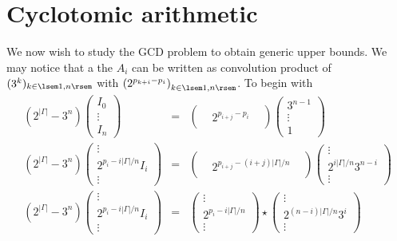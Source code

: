\documentclass[12pt,a4paper]{article}
\begin{document}
\section{Cyclotomic arithmetic}
We now wish to study the GCD problem to obtain generic upper bounds. 
We may notice that a the $A_i$ can be written as convolution product of $(3^k)_{k\in\lsem 1,n\rsem}$ with $\left(2^{p_{k+i}-p_i}\right)_{k\in \lsem1,n\rsem}$. 
To begin with 
\begin{eqnarray}
\left(2^{|\Gamma|}-3^n\right)\begin{pmatrix}
I_0 \\ \vdots \\ I_n 
\end{pmatrix} &=& \begin{pmatrix}
&&\\
&2^{p_{i+j}-p_i}&\\
&&
\end{pmatrix} \begin{pmatrix}
3^{n-1}\\ \vdots \\ 1
\end{pmatrix}
\\
\left(2^{|\Gamma|}-3^n\right)\begin{pmatrix}
 \vdots \\ 2^{p_{i}-i|\Gamma|/n}I_i \\ \vdots
\end{pmatrix}&=&\begin{pmatrix}
&&\\
&2^{p_{i+j}-(i+j)|\Gamma|/n}&\\
&&
\end{pmatrix} 
\begin{pmatrix}
\vdots \\ 2^{i|\Gamma|/n}3^{n-i}\\ \vdots
\end{pmatrix}
\\
\left(2^{|\Gamma|}-3^n\right)\begin{pmatrix}
 \vdots \\ 2^{p_{i}-i|\Gamma|/n}I_i \\ \vdots
\end{pmatrix}&=&\begin{pmatrix}
\vdots\\
2^{p_{i}-i|\Gamma|/n}\\
\vdots
\end{pmatrix} 
\star
\begin{pmatrix}
\vdots \\ 2^{(n-i)|\Gamma|/n}3^{i}\\ \vdots
\end{pmatrix}
\end{eqnarray} 
\end{document}
